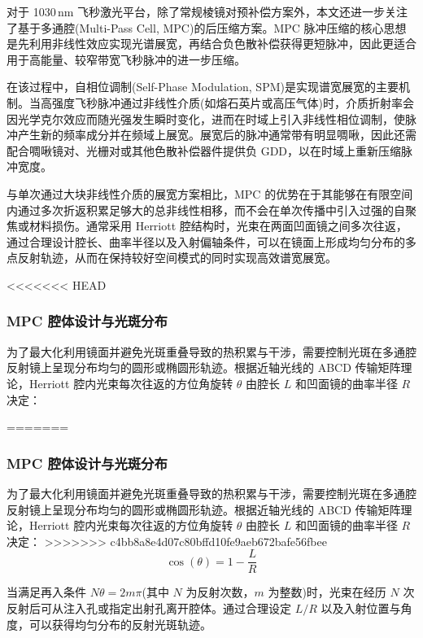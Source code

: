 对于 1030\,nm 飞秒激光平台，除了常规棱镜对预补偿方案外，本文还进一步关注了基于多通腔(Multi-Pass Cell, MPC)的后压缩方案。MPC 脉冲压缩的核心思想是先利用非线性效应实现光谱展宽，再结合负色散补偿获得更短脉冲，因此更适合用于高能量、较窄带宽飞秒脉冲的进一步压缩。

在该过程中，自相位调制(Self-Phase Modulation, SPM)是实现谱宽展宽的主要机制。当高强度飞秒脉冲通过非线性介质(如熔石英片或高压气体)时，介质折射率会因光学克尔效应而随光强发生瞬时变化，进而在时域上引入非线性相位调制，使脉冲产生新的频率成分并在频域上展宽。展宽后的脉冲通常带有明显啁啾，因此还需配合啁啾镜对、光栅对或其他色散补偿器件提供负 GDD，以在时域上重新压缩脉冲宽度。

与单次通过大块非线性介质的展宽方案相比，MPC 的优势在于其能够在有限空间内通过多次折返积累足够大的总非线性相移，而不会在单次传播中引入过强的自聚焦或材料损伤。通常采用 Herriott 腔结构时，光束在两面凹面镜之间多次往返，通过合理设计腔长、曲率半径以及入射偏轴条件，可以在镜面上形成均匀分布的多点反射轨迹，从而在保持较好空间模式的同时实现高效谱宽展宽。




<<<<<<< HEAD
\subsubsection{MPC 腔体设计与光斑分布}

为了最大化利用镜面并避免光斑重叠导致的热积累与干涉，需要控制光斑在多通腔反射镜上呈现分布均匀的圆形或椭圆形轨迹。根据近轴光线的 ABCD 传输矩阵理论，Herriott 腔内光束每次往返的方位角旋转 $\theta$ 由腔长 $L$ 和凹面镜的曲率半径 $R$ 决定：

=======

\subsubsection{MPC 腔体设计与光斑分布}

为了最大化利用镜面并避免光斑重叠导致的热积累与干涉，需要控制光斑在多通腔反射镜上呈现分布均匀的圆形或椭圆形轨迹。根据近轴光线的 ABCD 传输矩阵理论，Herriott 腔内光束每次往返的方位角旋转 $\theta$ 由腔长 $L$ 和凹面镜的曲率半径 $R$ 决定：
>>>>>>> c4bb8a8e4d07c80bffd10fe9aeb672bafe56fbee
\begin{equation}
    \cos(\theta) = 1 - \frac{L}{R}
\end{equation}

当满足再入条件 $N\theta = 2m\pi$(其中 $N$ 为反射次数，$m$ 为整数)时，光束在经历 $N$ 次反射后可从注入孔或指定出射孔离开腔体。通过合理设定 $L/R$ 以及入射位置与角度，可以获得均匀分布的反射光斑轨迹。


